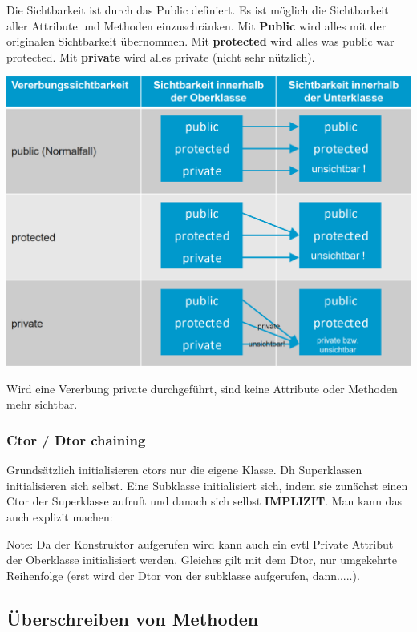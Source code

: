 

Die Sichtbarkeit ist durch das Public definiert. 
Es ist möglich die Sichtbarkeit aller Attribute und Methoden einzuschränken. 
Mit \textbf{Public} wird alles mit der originalen Sichtbarkeit übernommen. 
Mit \textbf{protected} wird alles was public war protected. 
Mit \textbf{private} wird alles private (nicht sehr nützlich).

\begin{center}
    \includegraphics[width=0.7\columnwidth]{pictures/Vererbung.png}    
\end{center}

Wird eine Vererbung private durchgeführt, sind keine Attribute oder Methoden mehr sichtbar.

\subsubsection{Ctor / Dtor chaining}

Grundsätzlich initialisieren ctors nur die eigene Klasse. 
Dh Superklassen initialisieren sich selbst. 
Eine Subklasse initialisiert sich, indem sie zunächst einen Ctor der Superklasse aufruft und danach sich selbst \textbf{IMPLIZIT}. 
Man kann das auch explizit machen:



Note: Da der Konstruktor aufgerufen wird kann auch ein evtl Private Attribut der Oberklasse initialisiert werden.
Gleiches gilt mit dem Dtor, nur umgekehrte Reihenfolge (erst wird der Dtor von der subklasse aufgerufen, dann.....).

\subsection{Überschreiben von Methoden}

